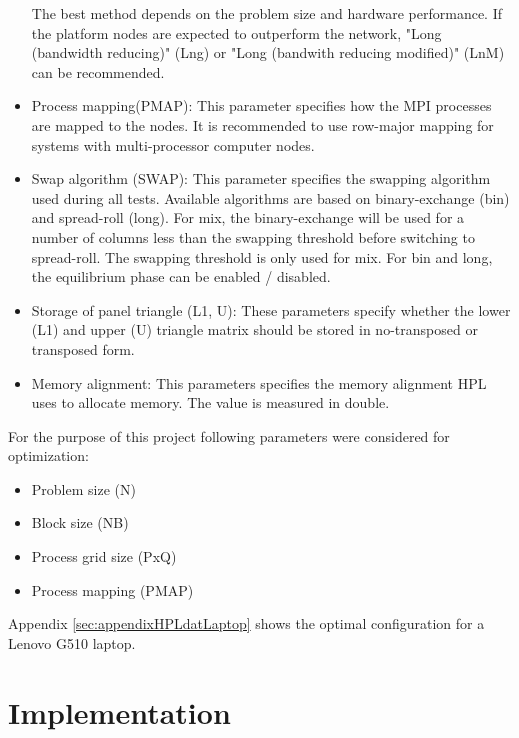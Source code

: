 \documentclass[10pt,twocolumn]{article}
\begin{document}
\begin{itemize}
The best method depends on the problem size and hardware performance. If the platform nodes are expected to outperform the network, "Long (bandwidth reducing)" (Lng) or "Long (bandwith reducing modified)" (LnM) can be recommended.

\item Process mapping(PMAP): This parameter specifies how the MPI processes are mapped to the nodes. It is recommended to use row-major mapping for systems with multi-processor computer nodes.

\item Swap algorithm (SWAP): This parameter specifies the swapping algorithm used during all tests. Available algorithms are based on binary-exchange (bin) and spread-roll (long). For mix, the binary-exchange will be used for a number of columns less than the swapping threshold before switching to spread-roll. The swapping threshold is only used for mix. For bin and long, the equilibrium phase can be enabled / disabled.

\item Storage of panel triangle (L1, U): These parameters specify whether the lower (L1) and upper (U) triangle matrix should be stored in no-transposed or transposed form.

\item Memory alignment: This parameters specifies the memory alignment HPL uses to allocate memory. The value is measured in double.
\end{itemize}

For the purpose of this project following parameters were considered for optimization:
\begin{itemize}
\item Problem size (N)
\item Block size (NB)
\item Process grid size (PxQ)
\item Process mapping (PMAP)
\end{itemize}

Appendix \ref{sec:appendixHPLdatLaptop} shows the optimal configuration for a Lenovo G510 laptop.



\section{Implementation}
\label{sec:implementation}
\end{document}
